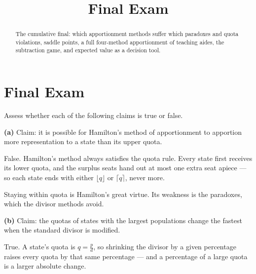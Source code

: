 \documentclass[12pt]{ximera}
\title{Final Exam}
\begin{document}
\begin{abstract}
The cumulative final: which apportionment methods suffer which paradoxes
and quota violations, saddle points, a full four-method apportionment of teaching
aides, the subtraction game, and expected value as a decision tool.
\end{abstract}
\maketitle

\section*{Final Exam}

\begin{problem}
Assess whether each of the following claims is true or false.

\begin{prompt}
\textbf{(a)} Claim: it is possible for Hamilton's method of apportionment to apportion
more representation to a state than its upper quota.

\begin{multipleChoice}
\end{multipleChoice}

\begin{feedback}
False. Hamilton's method always satisfies the quota rule. Every state first receives its
lower quota, and the surplus seats hand out at most one extra seat apiece --- so each
state ends with either $\lfloor q\rfloor$ or $\lceil q\rceil$, never more.

Staying within quota is Hamilton's great virtue. Its weakness is the paradoxes, which
the divisor methods avoid.
\end{feedback}
\end{prompt}

\begin{prompt}
\textbf{(b)} Claim: the quotas of states with the largest populations change the fastest
when the standard divisor is modified.

\begin{multipleChoice}
\end{multipleChoice}

\begin{feedback}
True. A state's quota is $q = \frac{p}{d}$, so shrinking the divisor by a given
percentage raises every quota by that same percentage --- and a percentage of a large
quota is a larger absolute change.


\end{feedback}
\end{prompt}
\end{problem}
\end{document}

